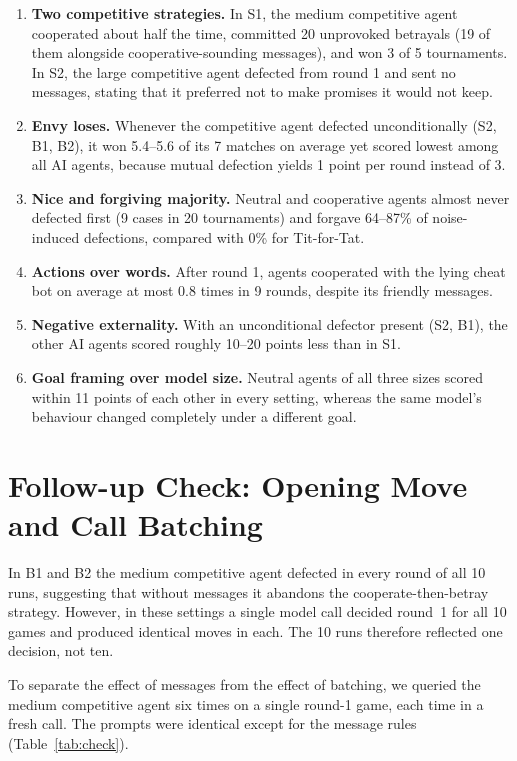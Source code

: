 \documentclass[11pt,a4paper]{article}
\begin{document}
\begin{enumerate}
  \item \textbf{Two competitive strategies.} In S1, the medium competitive agent cooperated about half the time, committed 20 unprovoked betrayals (19 of them alongside cooperative-sounding messages), and won 3 of 5 tournaments. In S2, the large competitive agent defected from round 1 and sent no messages, stating that it preferred not to make promises it would not keep.
  \item \textbf{Envy loses.} Whenever the competitive agent defected unconditionally (S2, B1, B2), it won 5.4--5.6 of its 7 matches on average yet scored lowest among all AI agents, because mutual defection yields 1 point per round instead of 3.
  \item \textbf{Nice and forgiving majority.} Neutral and cooperative agents almost never defected first (9 cases in 20 tournaments) and forgave 64--87\% of noise-induced defections, compared with 0\% for Tit-for-Tat.
  \item \textbf{Actions over words.} After round 1, agents cooperated with the lying cheat bot on average at most 0.8 times in 9 rounds, despite its friendly messages.
  \item \textbf{Negative externality.} With an unconditional defector present (S2, B1), the other AI agents scored roughly 10--20 points less than in S1.
  \item \textbf{Goal framing over model size.} Neutral agents of all three sizes scored within 11 points of each other in every setting, whereas the same model's behaviour changed completely under a different goal.
\end{enumerate}

\section{Follow-up Check: Opening Move and Call Batching}
\label{sec:check}

In B1 and B2 the medium competitive agent defected in every round of all 10 runs, suggesting that without messages it abandons the cooperate-then-betray strategy. However, in these settings a single model call decided round~1 for all 10 games and produced identical moves in each. The 10 runs therefore reflected one decision, not ten.

To separate the effect of messages from the effect of batching, we queried the medium competitive agent six times on a single round-1 game, each time in a fresh call. The prompts were identical except for the message rules (Table~\ref{tab:check}).
\end{document}
